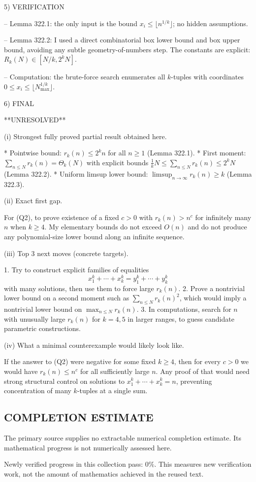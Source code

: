 5) VERIFICATION

-- Lemma 322.1: the only input is the bound $x_i\le\lfloor n^{1/k}\rfloor$; no hidden assumptions.

-- Lemma 322.2: I used a direct combinatorial box lower bound and box upper bound, avoiding any subtle geometry-of-numbers step.
The constants are explicit: $R_k(N)\in [N/k, 2^k N]$.

-- Computation: the brute-force search enumerates all $k$-tuples with coordinates $0\le x_i\le\lfloor N_{\max}^{1/k}\rfloor$.


6) FINAL

**UNRESOLVED**

(i) Strongest fully proved partial result obtained here.

* Pointwise bound: $r_k(n)\le 2^k n$ for all $n\ge 1$ (Lemma 322.1).
* First moment: $\sum_{n\le N} r_k(n)=\Theta_k(N)$ with explicit bounds $\frac{1}{k}N\le\sum_{n\le N}r_k(n)\le 2^k N$ (Lemma 322.2).
* Uniform limsup lower bound: $\limsup_{n\to\infty} r_k(n)\ge k$ (Lemma 322.3).

(ii) Exact first gap.

For (Q2), to prove existence of a fixed $c>0$ with $r_k(n)>n^c$ for infinitely many $n$ when $k\ge 4$.
My elementary bounds do not exceed $O(n)$ and do not produce any polynomial-size lower bound along an infinite sequence.

(iii) Top 3 next moves (concrete targets).

1. Try to construct explicit families of equalities
\[x_1^k+\cdots+x_k^k=y_1^k+\cdots+y_k^k\]
with many solutions, then use them to force large $r_k(n)$.
2. Prove a nontrivial lower bound on a second moment such as $\sum_{n\le N} r_k(n)^2$, which would imply a nontrivial lower bound on $\max_{n\le N} r_k(n)$.
3. In computations, search for $n$ with unusually large $r_k(n)$ for $k=4,5$ in larger ranges, to guess candidate parametric constructions.

(iv) What a minimal counterexample would likely look like.

If the answer to (Q2) were negative for some fixed $k\ge 4$, then for every $c>0$ we would have $r_k(n)\le n^c$ for all sufficiently large $n$.
Any proof of that would need strong structural control on solutions to $x_1^k+\cdots+x_k^k=n$, preventing concentration of many $k$-tuples at a single sum.




\subsection*{COMPLETION ESTIMATE}
The primary source supplies no extractable numerical completion estimate. Its mathematical progress is not numerically assessed here.

Newly verified progress in this collection pass: $0\%$. This measures new verification work, not the amount of mathematics achieved in the reused text.
